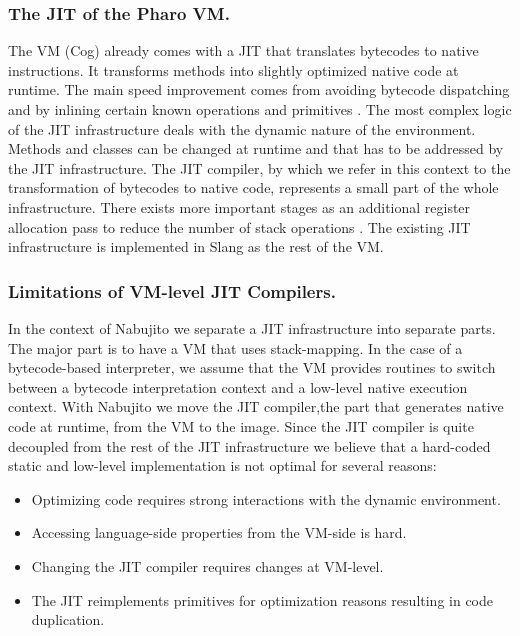 \subsubsection{The JIT of the Pharo VM.}
The \PH VM (Cog) already comes with a JIT that translates bytecodes to native instructions.
It transforms \ST methods into slightly optimized native code at runtime.
The main speed improvement comes from avoiding bytecode dispatching and by inlining certain known operations and primitives \cite{Ayco03a}.
The most complex logic of the JIT infrastructure deals with the dynamic nature of the \ST environment.
Methods and classes can be changed at runtime and that has to be addressed by the JIT infrastructure.
The JIT compiler, by which we refer in this context to the transformation of bytecodes to native code, represents a small part of the whole infrastructure.
There exists more important stages as an additional register allocation pass to reduce the number of stack operations \cite{Mira99a,Mira11a}.
The existing JIT infrastructure is implemented in Slang \cite[Ch.\ 5]{Blac09a} as the rest of the VM.

\subsubsection{Limitations of VM-level JIT Compilers.}
In the context of Nabujito we separate a JIT infrastructure into separate parts.
The major part is to have a VM that uses stack-mapping.
In the case of a bytecode-based interpreter, we assume that the VM provides routines to switch between a bytecode interpretation context and a low-level native execution context.
With Nabujito we move the JIT compiler,the part that generates native code at runtime, from the VM to the image.%
 Since the JIT compiler is quite decoupled from the rest of the JIT infrastructure we believe that a hard-coded static and low-level implementation is not optimal for several reasons:

\begin{itemize}
	\item Optimizing \ST code requires strong interactions with the dynamic environment.
	\item Accessing language-side properties from the VM-side is hard.
	\item Changing the JIT compiler requires changes at VM-level.
	\item The JIT reimplements primitives for optimization reasons resulting in code duplication.
\end{itemize}

